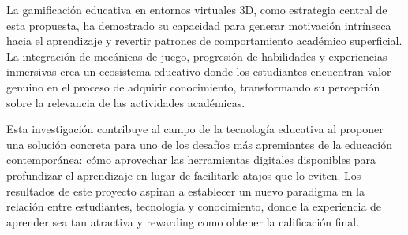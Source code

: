 La gamificación educativa en entornos virtuales 3D, como estrategia central de esta propuesta, ha demostrado su capacidad para generar motivación intrínseca hacia el aprendizaje y revertir patrones de comportamiento académico superficial. La integración de mecánicas de juego, progresión de habilidades y experiencias inmersivas crea un ecosistema educativo donde los estudiantes encuentran valor genuino en el proceso de adquirir conocimiento, transformando su percepción sobre la relevancia de las actividades académicas.

Esta investigación contribuye al campo de la tecnología educativa al proponer una solución concreta para uno de los desafíos más apremiantes de la educación contemporánea: cómo aprovechar las herramientas digitales disponibles para profundizar el aprendizaje en lugar de facilitarle atajos que lo eviten. Los resultados de este proyecto aspiran a establecer un nuevo paradigma en la relación entre estudiantes, tecnología y conocimiento, donde la experiencia de aprender sea tan atractiva y rewarding como obtener la calificación final.
